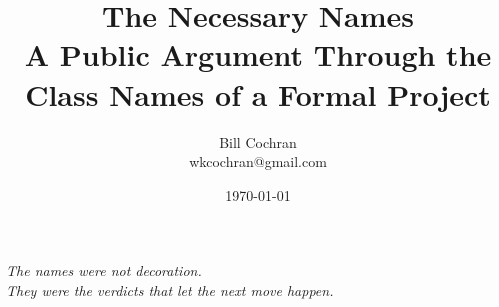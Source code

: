 \documentclass[12pt,oneside]{book}
\begin{document}
\title{The Necessary Names\\
\large A Public Argument Through the Class Names of a Formal Project}

\author{Bill Cochran\\wkcochran@gmail.com}
\date{\today}

\maketitle

\begin{center}
\vspace*{2em}
\textit{The names were not decoration. \\
They were the verdicts that let the next move happen.}
\vspace*{6em}
\end{center}

\newpage
\frontmatter
\onehalfspacing

\tableofcontents

\mainmatter



\cleardoublepage

\backmatter
\end{document}

